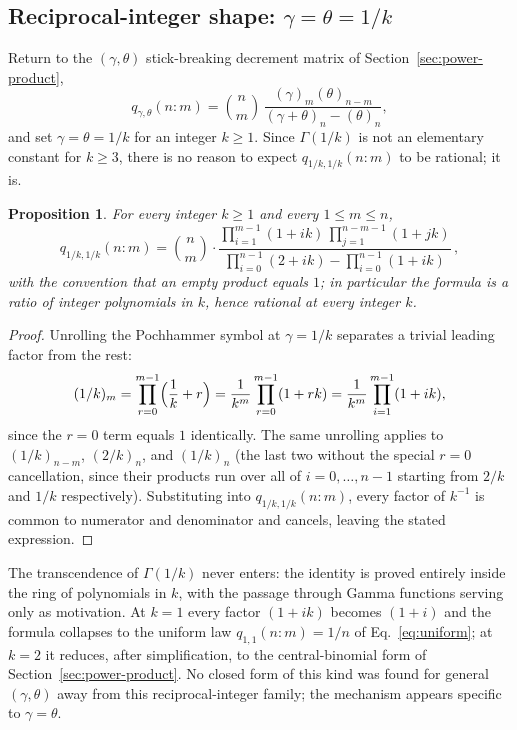 \documentclass[11pt]{article}
\theoremstyle{plain}
\newtheorem{proposition}[theorem]{Proposition}
\theoremstyle{definition}
\begin{document}
\subsection{Reciprocal-integer shape: \(\gamma=\theta=1/k\)}
\label{sec:reciprocal}

Return to the \((\gamma,\theta)\) stick-breaking decrement matrix of Section~\ref{sec:power-product},
\[
q_{\gamma,\theta}(n:m)=\binom nm\,\frac{(\gamma)_m(\theta)_{n-m}}{(\gamma+\theta)_n-(\theta)_n},
\]
and set \(\gamma=\theta=1/k\) for an integer \(k\ge1\). Since \(\Gamma(1/k)\) is not an elementary constant for \(k\ge3\), there is no reason to expect \(q_{1/k,1/k}(n:m)\) to be rational; it is.

\begin{proposition}
\label{prop:reciprocal}
For every integer \(k\ge1\) and every \(1\le m\le n\),
\[
q_{1/k,1/k}(n:m)=\binom nm\cdot\frac{\displaystyle\prod_{i=1}^{m-1}(1+ik)\,\prod_{j=1}^{n-m-1}(1+jk)}{\displaystyle\prod_{i=0}^{n-1}(2+ik)-\prod_{i=0}^{n-1}(1+ik)}\,,
\]
with the convention that an empty product equals \(1\); in particular the formula is a ratio of integer polynomials in \(k\), hence rational at every integer \(k\).
\end{proposition}

\begin{proof}
Unrolling the Pochhammer symbol at \(\gamma=1/k\) separates a trivial leading factor from the rest:
\[
(1/k)_m=\prod_{r=0}^{m-1}\Bigl(\frac1k+r\Bigr)=\frac1{k^m}\prod_{r=0}^{m-1}(1+rk)=\frac1{k^m}\prod_{i=1}^{m-1}(1+ik),
\]
since the \(r=0\) term equals \(1\) identically. The same unrolling applies to \((1/k)_{n-m}\), \((2/k)_n\), and \((1/k)_n\) (the last two without the special \(r=0\) cancellation, since their products run over all of \(i=0,\ldots,n-1\) starting from \(2/k\) and \(1/k\) respectively). Substituting into \(q_{1/k,1/k}(n:m)\), every factor of \(k^{-1}\) is common to numerator and denominator and cancels, leaving the stated expression.
\end{proof}

The transcendence of \(\Gamma(1/k)\) never enters: the identity is proved entirely inside the ring of polynomials in \(k\), with the passage through Gamma functions serving only as motivation. At \(k=1\) every factor \((1+ik)\) becomes \((1+i)\) and the formula collapses to the uniform law \(q_{1,1}(n:m)=1/n\) of Eq.~\eqref{eq:uniform}; at \(k=2\) it reduces, after simplification, to the central-binomial form of Section~\ref{sec:power-product}. No closed form of this kind was found for general \((\gamma,\theta)\) away from this reciprocal-integer family; the mechanism appears specific to \(\gamma=\theta\).
\end{document}
